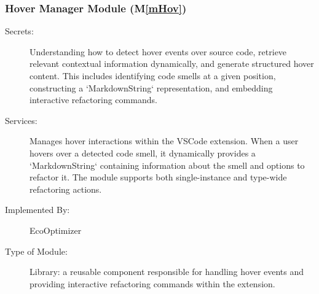 \documentclass[12pt, titlepage]{article}
\newcommand{\mref}[1]{M\ref{#1}}
\begin{document}
\subsubsection{Hover Manager Module (\mref{mHov})}

\begin{description}
    \item[Secrets:] Understanding how to detect hover events over source code, retrieve relevant contextual information dynamically, and generate structured hover content. This includes identifying code smells at a given position, constructing a `MarkdownString` representation, and embedding interactive refactoring commands.

    \item[Services:] Manages hover interactions within the VSCode extension. When a user hovers over a detected code smell, it dynamically provides a `MarkdownString` containing information about the smell and options to refactor it. The module supports both single-instance and type-wide refactoring actions.

    \item[Implemented By:] EcoOptimizer
    \item[Type of Module:] Library: a reusable component responsible for handling hover events and providing interactive refactoring commands within the extension.
\end{description}
\end{document}
